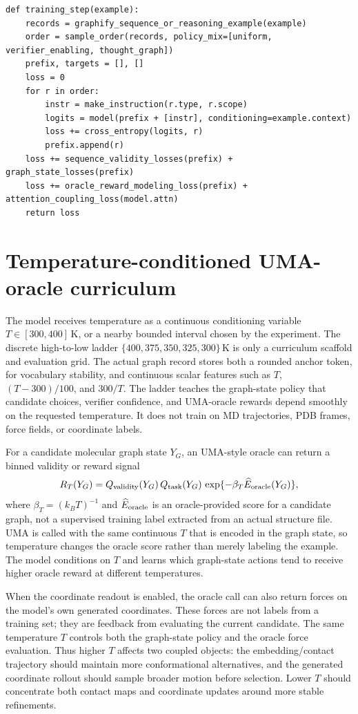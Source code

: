 \documentclass[11pt]{article}
\newcommand{\1}{\mathbf{1}}
\begin{document}
\begin{lstlisting}[caption={Random-order graph training step.}]
def training_step(example):
    records = graphify_sequence_or_reasoning_example(example)
    order = sample_order(records, policy_mix=[uniform, verifier_enabling, thought_graph])
    prefix, targets = [], []
    loss = 0
    for r in order:
        instr = make_instruction(r.type, r.scope)
        logits = model(prefix + [instr], conditioning=example.context)
        loss += cross_entropy(logits, r)
        prefix.append(r)
    loss += sequence_validity_losses(prefix) + graph_state_losses(prefix)
    loss += oracle_reward_modeling_loss(prefix) + attention_coupling_loss(model.attn)
    return loss
\end{lstlisting}

\section{Temperature-conditioned UMA-oracle curriculum}

The model receives temperature as a continuous conditioning variable \(T\in[300,400]\,\mathrm K\), or a nearby bounded interval chosen by the experiment. The discrete high-to-low ladder \(\{400,375,350,325,300\}\,\mathrm K\) is only a curriculum scaffold and evaluation grid. The actual graph record stores both a rounded anchor token, for vocabulary stability, and continuous scalar features such as \(T\), \((T-300)/100\), and \(300/T\). The ladder teaches the graph-state policy that candidate choices, verifier confidence, and UMA-oracle rewards depend smoothly on the requested temperature. It does not train on MD trajectories, PDB frames, force fields, or coordinate labels.

For a candidate molecular graph state \(Y_G\), an UMA-style oracle can return a binned validity or reward signal
\[
  R_T(Y_G)=Q_{\rm validity}(Y_G)\,Q_{\rm task}(Y_G)\,\exp\{-\beta_T \widehat E_{\rm oracle}(Y_G)\},
\]
where \(\beta_T=(k_BT)^{-1}\) and \(\widehat E_{\rm oracle}\) is an oracle-provided score for a candidate graph, not a supervised training label extracted from an actual structure file. UMA is called with the same continuous \(T\) that is encoded in the graph state, so temperature changes the oracle score rather than merely labeling the example. The model conditions on \(T\) and learns which graph-state actions tend to receive higher oracle reward at different temperatures.

When the coordinate readout is enabled, the oracle call can also return forces on the model's own generated coordinates. These forces are not labels from a training set; they are feedback from evaluating the current candidate. The same temperature \(T\) controls both the graph-state policy and the oracle force evaluation. Thus higher \(T\) affects two coupled objects: the embedding/contact trajectory should maintain more conformational alternatives, and the generated coordinate rollout should sample broader motion before selection. Lower \(T\) should concentrate both contact maps and coordinate updates around more stable refinements.
\end{document}
